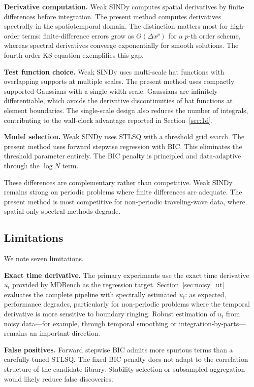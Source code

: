 \documentclass[preprint,12pt]{elsarticle}
\begin{document}
\textbf{Derivative computation.} Weak SINDy computes spatial derivatives by finite differences before integration. The present method computes derivatives spectrally in the spatiotemporal domain. The distinction matters most for high-order terms: finite-difference errors grow as $O(\Delta x^p)$ for a $p$-th order scheme, whereas spectral derivatives converge exponentially for smooth solutions. The fourth-order KS equation exemplifies this gap.

\textbf{Test function choice.} Weak SINDy uses multi-scale hat functions with overlapping supports at multiple scales. The present method uses compactly supported Gaussians with a single width scale. Gaussians are infinitely differentiable, which avoids the derivative discontinuities of hat functions at element boundaries. The single-scale design also reduces the number of integrals, contributing to the wall-clock advantage reported in Section~\ref{sec:1d}.

\textbf{Model selection.} Weak SINDy uses STLSQ with a threshold grid search. The present method uses forward stepwise regression with BIC. This eliminates the threshold parameter entirely. The BIC penalty is principled and data-adaptive through the $\log N$ term.

These differences are complementary rather than competitive. Weak SINDy remains strong on periodic problems where finite differences are adequate. The present method is most competitive for non-periodic traveling-wave data, where spatial-only spectral methods degrade.

\subsection{Limitations}

We note seven limitations.

\textbf{Exact time derivative.} The primary experiments use the exact time derivative $u_t$ provided by MDBench as the regression target. Section~\ref{sec:noisy_ut} evaluates the complete pipeline with spectrally estimated $u_t$: as expected, performance degrades, particularly for non-periodic problems where the temporal derivative is more sensitive to boundary ringing. Robust estimation of $u_t$ from noisy data---for example, through temporal smoothing or integration-by-parts---remains an important direction.

\textbf{False positives.} Forward stepwise BIC admits more spurious terms than a carefully tuned STLSQ. The fixed BIC penalty does not adapt to the correlation structure of the candidate library. Stability selection or subsampled aggregation would likely reduce false discoveries.
\end{document}
